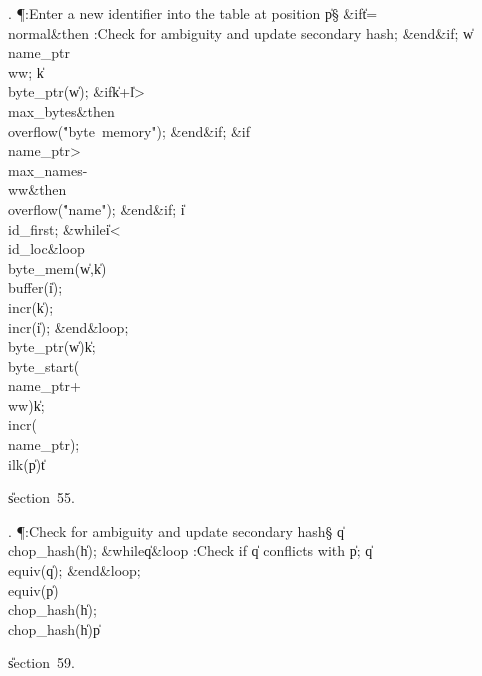 . \P\?:Enter a new identifier into the table at position \|p\X\S\?\6
\&{if}\1\1\8\|t\?=\?\\{normal}\2\8\&{then}\6
:Check for ambiguity and update secondary hash\X;\2\6
\&{end}\8\2\&{if}\1;\6
\|w\?\K\?\\{name\_ptr}\?\?\\{ww};\5
\|k\?\K\?\\{byte\_ptr}\?\1(\?\|w\?\2)\?;\6
\&{if}\1\1\8\|k\?+\?\|l\?>\?\\{max\_bytes}\2\8\&{then}\6
\\{overflow}\?\1(\?\.{"byte\ memory"}\?\2)\?;\2\6
\&{end}\8\2\&{if}\1;\6
\&{if}\1\1\8\\{name\_ptr}\?>\?\\{max\_names}\?-\?\\{ww}\2\8\&{then}\6
\\{overflow}\?\1(\?\.{"name"}\?\2)\?;\2\6
\&{end}\8\2\&{if}\1;\6
\|i\?\K\?\\{id\_first};\6
\1\&{while}\8\|i\?<\?\\{id\_loc}\8\&{loop}\6
\\{byte\_mem}\?\1(\?\|w\?,\?\|k\?\2)\K\?\\{buffer}\?\1(\?\|i\?\2)\?;\5
\\{incr}\?\1(\?\|k\?\2)\?;\5
\\{incr}\?\1(\?\|i\?\2)\?;\2\6
\&{end}\8\&{loop};\6
\\{byte\_ptr}\?\1(\?\|w\?\2)\K\?\|k;\5
\\{byte\_start}\?\1(\?\\{name\_ptr}\?+\?\\{ww}\?\2)\K\?\|k;\5
\\{incr}\?\1(\?\\{name\_ptr}\?\2)\?;\5
\\{ilk}\?\1(\?\|p\?\2)\K\?\|t\par
\U section~55.\fi

. \P\?:Check for ambiguity and update secondary hash\X\S\?\6
\|q\?\K\?\\{chop\_hash}\?\1(\?\|h\?\2)\?;\6
\1\&{while}\8\|q\?\I{}\8\&{loop}\6
:Check if \|q conflicts with \|p\X;\6
\|q\?\K\?\\{equiv}\?\1(\?\|q\?\2)\?;\2\6
\&{end}\8\&{loop};\6
\\{equiv}\?\1(\?\|p\?\2)\K\?\\{chop\_hash}\?\1(\?\|h\?\2)\?;\5
\\{chop\_hash}\?\1(\?\|h\?\2)\K\?\|p\par
\U section~59.\fi

